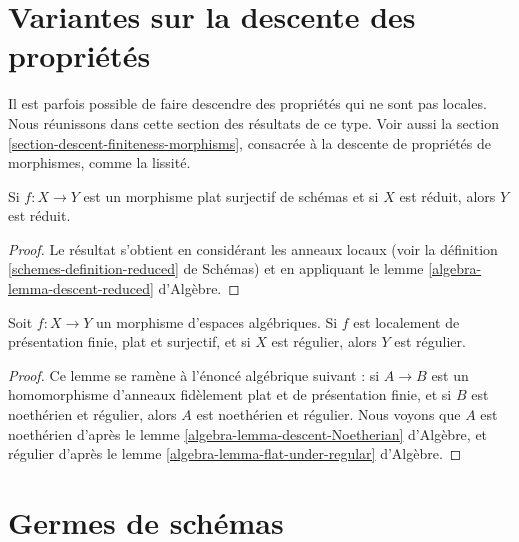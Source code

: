 \section{Variantes sur la descente des propriétés}
\label{section-variants}

\noindent
Il est parfois possible de faire descendre des propriétés qui ne sont pas
locales. Nous réunissons dans cette section des résultats de ce type. Voir
aussi la section \ref{section-descent-finiteness-morphisms}, consacrée à la
descente de propriétés de morphismes, comme la lissité.

\begin{lemma}
\label{lemma-descend-reduced}
Si $f : X \to Y$ est un morphisme plat surjectif de schémas et si $X$ est
réduit, alors $Y$ est réduit.
\end{lemma}

\begin{proof}
Le résultat s'obtient en considérant les anneaux locaux (voir la définition
\ref{schemes-definition-reduced} de Schémas) et en appliquant le lemme
\ref{algebra-lemma-descent-reduced} d'Algèbre.
\end{proof}

\begin{lemma}
\label{lemma-descend-regular}
Soit $f : X \to Y$ un morphisme d'espaces algébriques. Si $f$ est localement
de présentation finie, plat et surjectif, et si $X$ est régulier, alors $Y$
est régulier.
\end{lemma}

\begin{proof}
Ce lemme se ramène à l'énoncé algébrique suivant : si $A \to B$ est un
homomorphisme d'anneaux fidèlement plat et de présentation finie, et si $B$
est noethérien et régulier, alors $A$ est noethérien et régulier. Nous voyons
que $A$ est noethérien d'après le lemme
\ref{algebra-lemma-descent-Noetherian} d'Algèbre, et régulier d'après le lemme
\ref{algebra-lemma-flat-under-regular} d'Algèbre.
\end{proof}









\section{Germes de schémas}
\label{section-germs}

